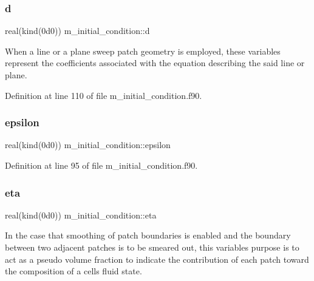 \subsubsection{\texorpdfstring{d}{d}}
{\footnotesize\ttfamily real(kind(0d0)) m\+\_\+initial\+\_\+condition\+::d}



When a line or a plane sweep patch geometry is employed, these variables represent the coefficients associated with the equation describing the said line or plane. 



Definition at line 110 of file m\+\_\+initial\+\_\+condition.\+f90.

\mbox{\label{namespacem__initial__condition_a0fb096d74052e49545e6ec72b3c2a114}} 
\subsubsection{\texorpdfstring{epsilon}{epsilon}}
{\footnotesize\ttfamily real(kind(0d0)) m\+\_\+initial\+\_\+condition\+::epsilon}



Definition at line 95 of file m\+\_\+initial\+\_\+condition.\+f90.

\mbox{\label{namespacem__initial__condition_a44e267143646437278341b252110443b}} 
\subsubsection{\texorpdfstring{eta}{eta}}
{\footnotesize\ttfamily real(kind(0d0)) m\+\_\+initial\+\_\+condition\+::eta}



In the case that smoothing of patch boundaries is enabled and the boundary between two adjacent patches is to be smeared out, this variable\textquotesingle{}s purpose is to act as a pseudo volume fraction to indicate the contribution of each patch toward the composition of a cell\textquotesingle{}s fluid state. 



